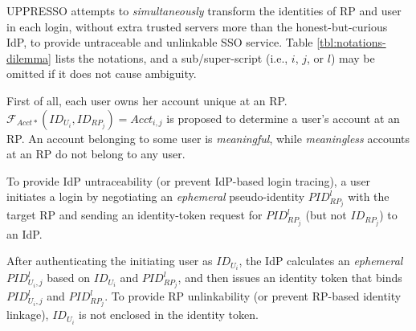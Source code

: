 UPPRESSO attempts to \emph{simultaneously} transform the identities of RP and user in each login,
        without extra trusted servers more than the honest-but-curious IdP,
         to provide untraceable and unlinkable SSO service.
%
Table \ref{tbl:notations-dilemma} lists the notations,
and a sub/super-script (i.e., $i$, $j$, or $l$) may be omitted if it does not cause ambiguity.




First of all, each user owns her account unique at an RP.
$\mathcal{F}_{Acct\ast}(ID_{U_i}, ID_{RP_j}) = Acct_{i,j}$ is proposed to determine a user's account at an RP.
An account belonging to some user is \emph{meaningful},
while \emph{meaningless} accounts at an RP do not belong to any user.

To provide IdP untraceability (or prevent IdP-based login tracing),
    a user initiates a login by negotiating an \emph{ephemeral} pseudo-identity $PID^l_{RP_j}$  with the target RP and sending an identity-token request for $PID^l_{RP_j}$ (but not $ID_{RP_j}$) to an IdP.

After authenticating the initiating user as $ID_{U_i}$, the IdP calculates an \emph{ephemeral} $PID^l_{U_i,j}$ based on $ID_{U_i}$ and $PID^l_{RP_j}$, and then issues an identity token that binds $PID^l_{U_i,j}$ and $PID^l_{RP_j}$.
To provide RP unlinkability (or prevent RP-based identity linkage),
    $ID_{U_i}$ is not enclosed in the identity token.

